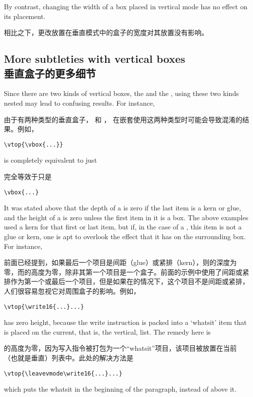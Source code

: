 By contrast, changing the width of a box placed in vertical
mode has no effect on its placement.

相比之下，更改放置在垂直模式中的盒子的宽度对其放置没有影响。


\subsection{More subtleties with vertical boxes\\垂直盒子的更多细节}

Since there are two kinds of vertical boxes, the  and
the , using these two kinds nested may lead to
confusing results. For instance, 

由于有两种类型的垂直盒子， 和 ，
在嵌套使用这两种类型时可能会导致混淆的结果。例如，
\begin{verbatim}
\vtop{\vbox{...}}
\end{verbatim}
is completely equivalent to just 

完全等效于只是
\begin{verbatim}
\vbox{...}
\end{verbatim}

It was stated above that
the depth of a  is zero if the last item
is a kern or  glue, and the height of a  is
zero unless the first item in it is a box.
The above examples used a kern for that first or last item, 
but if, in the case of a , 
this item is not a glue or kern, one is apt to
overlook the effect that it has on the surrounding box.
For instance,

前面已经提到，如果最后一个项目是间距（glue）或紧排（kern），则的深度为零，而的高度为零，除非其第一个项目是一个盒子。前面的示例中使用了间距或紧排作为第一个或最后一个项目，但是如果在的情况下，这个项目不是间距或紧排，人们很容易忽视它对周围盒子的影响。例如，
\begin{verbatim}
\vtop{\write16{...}...}
\end{verbatim}
has zero height,
because the write instruction
is packed into a `whatsit' item that is placed on the current,
that is, the vertical, list. 
The remedy here is

的高度为零，因为写入指令被打包为一个“whatsit”项目，该项目被放置在当前（也就是垂直）列表中。此处的解决方法是
\begin{verbatim}
\vtop{\leavevmode\write16{...}...}
\end{verbatim}
which puts the whatsit in the beginning of the paragraph,
instead of above it.

